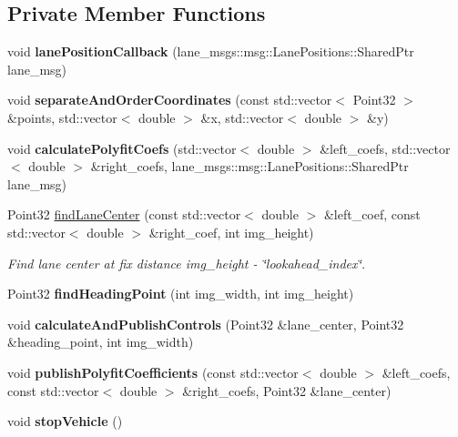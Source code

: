 \subsection*{Private Member Functions}
\begin{DoxyCompactItemize}
\item 
\mbox{\label{classMotionControlNode_a282a762671c7b667f174717ff0dcea20}} 
void {\bfseries lane\+Position\+Callback} (lane\+\_\+msgs\+::msg\+::\+Lane\+Positions\+::\+Shared\+Ptr lane\+\_\+msg)
\item 
\mbox{\label{classMotionControlNode_a67cc5bcda286ffbe809d0555bdaf6a8d}} 
void {\bfseries separate\+And\+Order\+Coordinates} (const std\+::vector$<$ Point32 $>$ \&points, std\+::vector$<$ double $>$ \&x, std\+::vector$<$ double $>$ \&y)
\item 
\mbox{\label{classMotionControlNode_acab5e28f36d5a16521c38073077e2b1d}} 
void {\bfseries calculate\+Polyfit\+Coefs} (std\+::vector$<$ double $>$ \&left\+\_\+coefs, std\+::vector$<$ double $>$ \&right\+\_\+coefs, lane\+\_\+msgs\+::msg\+::\+Lane\+Positions\+::\+Shared\+Ptr lane\+\_\+msg)
\item 
Point32 \hyperlink{classMotionControlNode_a2c48d9d1ef7222d03c69f8dc86cd1842}{find\+Lane\+Center} (const std\+::vector$<$ double $>$ \&left\+\_\+coef, const std\+::vector$<$ double $>$ \&right\+\_\+coef, int img\+\_\+height)
\begin{DoxyCompactList}\small\item\em Find lane center at fix distance img\+\_\+height -\/ \char`\"{}lookahead\+\_\+index\char`\"{}. \end{DoxyCompactList}\item 
\mbox{\label{classMotionControlNode_a9a30201e0d7cb92779f222c38804ec03}} 
Point32 {\bfseries find\+Heading\+Point} (int img\+\_\+width, int img\+\_\+height)
\item 
\mbox{\label{classMotionControlNode_abad42e896700d175ae870d3eed4a79ea}} 
void {\bfseries calculate\+And\+Publish\+Controls} (Point32 \&lane\+\_\+center, Point32 \&heading\+\_\+point, int img\+\_\+width)
\item 
\mbox{\label{classMotionControlNode_a2f890913a81fdb965348897dbd972a77}} 
void {\bfseries publish\+Polyfit\+Coefficients} (const std\+::vector$<$ double $>$ \&left\+\_\+coefs, const std\+::vector$<$ double $>$ \&right\+\_\+coefs, Point32 \&lane\+\_\+center)
\item 
\mbox{\label{classMotionControlNode_a9ab1d5f6c9141de3c04ce19bc29e14a6}} 
void {\bfseries stop\+Vehicle} ()
\end{DoxyCompactItemize}
